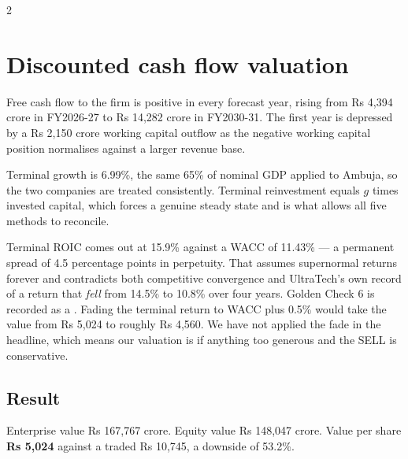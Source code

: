 \begin{paracol}{2}
\switchcolumn*
\section{Discounted cash flow valuation}

Free cash flow to the firm is positive in every forecast year, rising from Rs 4,394
crore in FY2026-27 to Rs 14,282 crore in FY2030-31. The first year is depressed by a
Rs 2,150 crore working capital outflow as the negative working capital position
normalises against a larger revenue base.

Terminal growth is 6.99\%, the same 65\% of nominal GDP applied to Ambuja, so the two
companies are treated consistently. Terminal reinvestment equals $g$ times invested
capital, which forces a genuine steady state and is what allows all five methods to
reconcile.

\begin{warnbox}
Terminal ROIC comes out at 15.9\% against a WACC of 11.43\% — a permanent spread of
4.5 percentage points in perpetuity. That assumes supernormal returns forever and
contradicts both competitive convergence and UltraTech's own record of a return that
\emph{fell} from 14.5\% to 10.8\% over four years. Golden Check 6 is recorded as a
\FAIL. Fading the terminal return to WACC plus 0.5\% would take the value from
Rs 5,024 to roughly Rs 4,560. We have not applied the fade in the headline, which
means our valuation is if anything too generous and the SELL is conservative.
\end{warnbox}

\subsection{Result}

\begin{keybox}
Enterprise value Rs 167,767 crore. Equity value Rs 148,047 crore. Value per share
\textbf{Rs 5,024} against a traded Rs 10,745, a downside of 53.2\%.
\end{keybox}

\switchcolumn
{}



\end{paracol}

